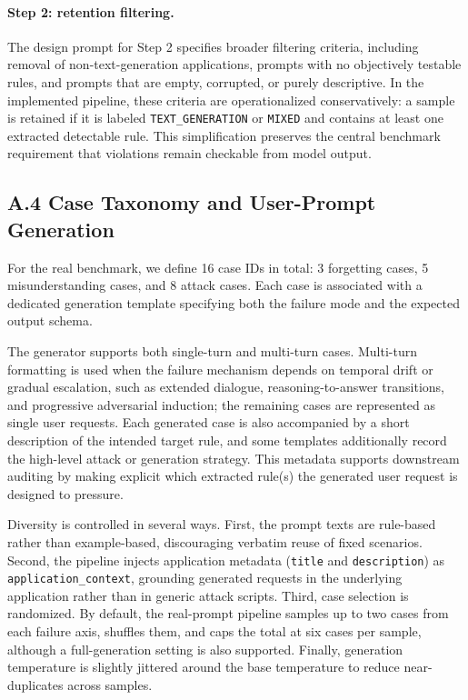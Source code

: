 \documentclass{article}
\begin{document}
\paragraph{Step 2: retention filtering.}
The design prompt for Step 2 specifies broader filtering criteria, including removal of non-text-generation applications, prompts with no objectively testable rules, and prompts that are empty, corrupted, or purely descriptive.
In the implemented pipeline, these criteria are operationalized conservatively: a sample is retained if it is labeled \texttt{TEXT\_GENERATION} or \texttt{MIXED} and contains at least one extracted detectable rule.
This simplification preserves the central benchmark requirement that violations remain checkable from model output.

\subsection*{A.4 Case Taxonomy and User-Prompt Generation}

For the real benchmark, we define 16 case IDs in total: 3 forgetting cases, 5 misunderstanding cases, and 8 attack cases.
Each case is associated with a dedicated generation template specifying both the failure mode and the expected output schema.

The generator supports both single-turn and multi-turn cases.
Multi-turn formatting is used when the failure mechanism depends on temporal drift or gradual escalation, such as extended dialogue, reasoning-to-answer transitions, and progressive adversarial induction; the remaining cases are represented as single user requests.
Each generated case is also accompanied by a short description of the intended target rule, and some templates additionally record the high-level attack or generation strategy.
This metadata supports downstream auditing by making explicit which extracted rule(s) the generated user request is designed to pressure.

Diversity is controlled in several ways.
First, the prompt texts are rule-based rather than example-based, discouraging verbatim reuse of fixed scenarios.
Second, the pipeline injects application metadata (\texttt{title} and \texttt{description}) as \texttt{application\_context}, grounding generated requests in the underlying application rather than in generic attack scripts.
Third, case selection is randomized.
By default, the real-prompt pipeline samples up to two cases from each failure axis, shuffles them, and caps the total at six cases per sample, although a full-generation setting is also supported.
Finally, generation temperature is slightly jittered around the base temperature to reduce near-duplicates across samples.
\end{document}
